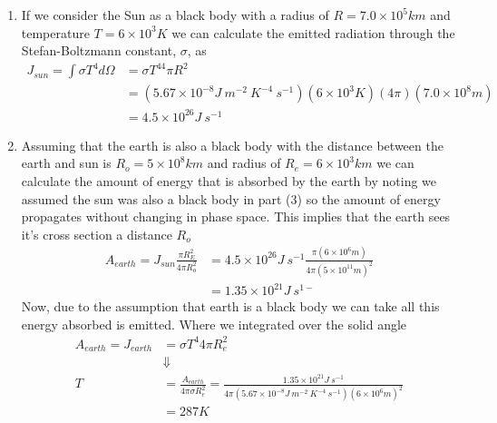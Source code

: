 \documentclass[11pt]{article}
\numberwithin{equation}{section}
\begin{document}
\begin{enumerate}[(1)]
\item If we consider the Sun as a black body with a radius of $R = 7.0\times10^{5}\unit{km}$ 
and temperature $T = 6\times10^{3}\unit{K}$ we can calculate the emitted radiation through
the Stefan-Boltzmann constant, $\sigma$, as
\begin{align*}
J_{sun} = \int\sigma T^4d\Omega &= \sigma T^44\pi R^2\\
&= (5.67\times10^{-8}\unit{J\ m^{-2}\ K^{-4}\ s^{-1}})(6\times10^{3}\unit{K})(4\pi)(7.0\times10^{8}\unit{m})\\
&= 4.5\times10^{26}\unit{J\ s^{-1}}
\end{align*}

\item Assuming that the earth is also a black body with the distance between the earth and
sun is $R_o=5\times10^{8}\unit{km}$ and radius of $R_e=6\times10^{3}\unit{km}$ we can
calculate the amount of energy that is absorbed by the earth by noting we assumed the sun
was also a black body in part (3) so the amount of energy propagates without changing in 
phase space. This implies that the earth sees it's cross section a distance $R_o$
\begin{align*}
A_{earth} = J_{sun}\frac{\pi R_E^2}{4\pi R_o^2} &= 4.5\times10^{26}\unit{J\ s^{-1}}\frac{\pi (6\times10^{6}\unit{m})}{4\pi(5\times10^{11}\unit{m})^2}\\
&= 1.35\times10^{21}\unit{J\ s^{1-}}
\end{align*}
Now, due to the assumption that earth is a black body we can take all this energy absorbed
is emitted. Where we integrated over the solid angle 
\begin{align*}
A_{earth} = J_{earth} &= \sigma T^{4}4\pi R_e^2\\
&\Downarrow\\
T &= \frac{A_{earth}}{4\pi\sigma R_e^2} = \frac{1.35\times10^{21}\unit{J\ s^{-1}}}{4\pi(5.67\times10^{-8}\unit{J\ m^{-2}\ K^{-4}\ s^{-1}})(6\times10^{6}\unit{m})^2}\\
&= 287\unit{K}
\end{align*}



\end{enumerate}

\pagebreak
\end{document}
